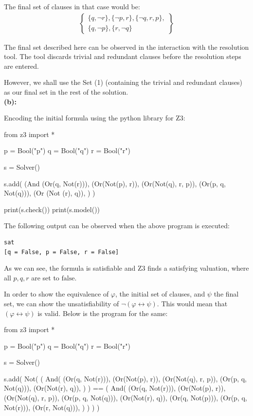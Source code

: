 \documentclass[12pt,letterpaper, onecolumn]{exam}
\begin{document}
\begin{questions}
	The final set of clauses in that case would be:
	\begin{align*}
		\left .
			\begin{cases}
				\{q, \neg r\}, \{\neg p, r\}, \{\neg q, r, p\}, \\
				\{ q, \neg p \}, \{ r, \neg q \}
			\end{cases}
		\right\}
	\end{align*}

	The final set described here can be observed in the interaction with the resolution tool. 
	The tool discards trivial and redundant clauses before the resolution steps are entered.

	However, we shall use the Set (1) (containing the trivial and redundant clauses) as our final set in the rest of the solution. \\
	

	\textbf{(b):}

	Encoding the initial formula using the python library for Z3:

	\begin{python}
from z3 import *

p = Bool("p")
q = Bool("q")
r = Bool("r")

s = Solver()

s.add(
	(And 
		(Or(q, Not(r))),
		(Or(Not(p), r)),
		(Or(Not(q), r, p)), 
		(Or(p, q, Not(q))), 
		(Or (Not (r), q)),
	)
)


print(s.check())
print(s.model())
	\end{python}

	The following output can be observed when the above program is executed:
\begin{lstlisting}
sat
[q = False, p = False, r = False]
\end{lstlisting}
As we can see, the formula is satisfiable and Z3 finds a satisfying valuation, where all $p, q, r$ are set to $\text{false}$.

In order to show the equivalence of $ \varphi $, the initial set of clauses, and $ \psi $ the final set, we can show the unsatisfiability of 
$ \neg (\varphi \leftrightarrow \psi) $. This would mean that $ (\varphi \leftrightarrow \psi) $ is valid. Below is the program for the same:
\begin{python}
from z3 import *

p = Bool("p")
q = Bool("q")
r = Bool("r")

s = Solver()

s.add(
	Not(
		(
			And(
				(Or(q, Not(r))),
				(Or(Not(p), r)),
				(Or(Not(q), r, p)),
				(Or(p, q, Not(q))),
				(Or(Not(r), q)),
			)
		)
		== (
			And(
				(Or(q, Not(r))),
				(Or(Not(p), r)),
				(Or(Not(q), r, p)),
				(Or(p, q, Not(q))),
				(Or(Not(r), q)),
				(Or(q, Not(p))),
				(Or(p, q, Not(r))),
				(Or(r, Not(q))),
			)
		)
	)
)


\end{python}
\end{questions}
\end{document}
